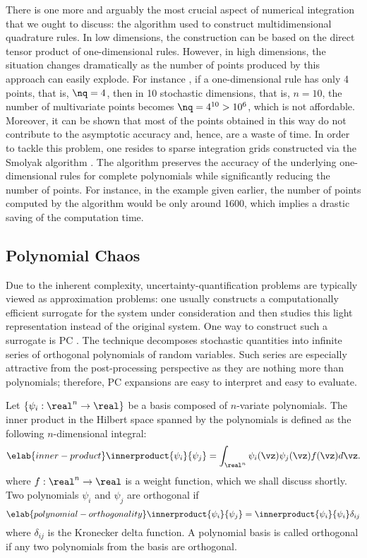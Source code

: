 There is one more and arguably the most crucial aspect of numerical integration
that we ought to discuss: the algorithm used to construct multidimensional
quadrature rules. In low dimensions, the construction can be based on the direct
tensor product of one-dimensional rules. However, in high dimensions, the
situation changes dramatically as the number of points produced by this approach
can easily explode. For instance \cite{heiss2008}, if a one-dimensional rule has
only 4 points, that is, $\nq = 4$, then in 10 stochastic dimensions, that is, $n
= 10$, the number of multivariate points becomes $\nq = 4^{10} > 10^6$, which is
not affordable. Moreover, it can be shown that most of the points obtained in
this way do not contribute to the asymptotic accuracy and, hence, are a waste of
time. In order to tackle this problem, one resides to sparse integration grids
constructed via the Smolyak algorithm \cite{burkardt, eldred2008, heiss2008}.
The algorithm preserves the accuracy of the underlying one-dimensional rules for
complete polynomials while significantly reducing the number of points. For
instance, in the example given earlier, the number of points computed by the
algorithm would be only around 1600, which implies a drastic saving of the
computation time.

\subsection{Polynomial Chaos}

Due to the inherent complexity, uncertainty-quantification problems are
typically viewed as approximation problems: one usually constructs a
computationally efficient surrogate for the system under consideration and then
studies this light representation instead of the original system. One way to
construct such a surrogate is \ac{PC} \cite{xiu2010}. The technique decomposes
stochastic quantities into infinite series of orthogonal polynomials of random
variables. Such series are especially attractive from the post-processing
perspective as they are nothing more than polynomials; therefore, \ac{PC}
expansions are easy to interpret and easy to evaluate.

Let $\{ \psi_i: \real^n \to \real \}$ be a basis composed of $n$-variate
polynomials. The inner product in the Hilbert space spanned by the polynomials
is defined as the following $n$-dimensional integral:
\begin{equation} \elab{inner-product}
  \innerproduct{\psi_i}{\psi_j} = \int_{\real^n} \psi_i(\vz) \psi_j(\vz) f(\vz) d\vz.
\end{equation}
where $f: \real^n \to \real$ is a weight function, which we shall discuss
shortly. Two polynomials $\psi_i$ and $\psi_j$ are orthogonal if
\begin{equation} \elab{polynomial-orthogonality}
  \innerproduct{\psi_i}{\psi_j} = \innerproduct{\psi_i}{\psi_i} \delta_{ij}
\end{equation}
where $\delta_{ij}$ is the Kronecker delta function. A polynomial basis is
called orthogonal if any two polynomials from the basis are orthogonal.

